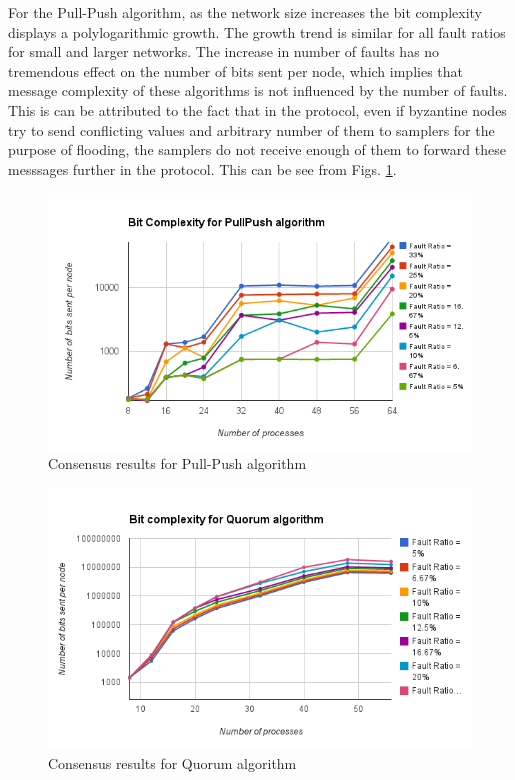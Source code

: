 For the Pull-Push algorithm, as the network size increases the bit complexity displays a polylogarithmic growth. The growth trend is similar for all fault ratios for small and larger networks. The increase in number of faults has no tremendous effect on the number of bits sent per node, which implies that message complexity of these algorithms is not influenced by the number of faults. This is can be attributed to the fact that in the protocol, even if byzantine nodes try to send conflicting values and arbitrary number of them to samplers for the purpose of flooding, the samplers do not receive enough of them to forward these messsages further in the protocol. This can be see from Figs. \ref{fig:pull_push}.
\begin{figure}[h]
 \centering
\includegraphics[scale=0.4]{pull_push}
\caption{Consensus results for Pull-Push algorithm}
 \label{fig:pull_push}
\end{figure}

\begin{figure}[h]
 \centering
\includegraphics[scale=0.4]{quorum}
\caption{Consensus results for Quorum algorithm}
 \label{fig:quorum}
\end{figure}

